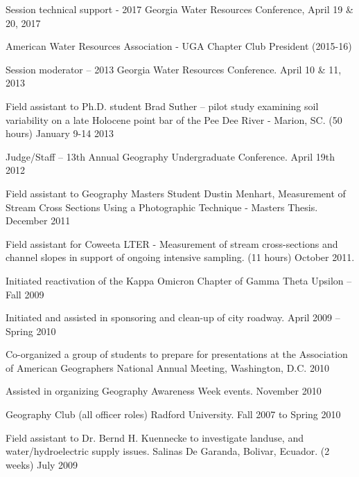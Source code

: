 \documentclass[10pt,letterpaper]{article}
\newenvironment{indentsection}[1]%
{\begin{list}{}%
	{\setlength{\leftmargin}{#1}}%
	\item[]%
}
{\end{list}}
\begin{document}
	\begin{itemize*}

	\item
	Session technical support - 2017 Georgia Water Resources Conference, April 19 \& 20, 2017
	\item
	American Water Resources Association - UGA Chapter Club President (2015-16)
	\item
	Session moderator – 2013 Georgia Water Resources Conference. April 10 \& 11, 2013
	\item
	Field assistant to Ph.D. student Brad Suther – pilot study examining soil variability on a late Holocene point bar of the Pee Dee River - Marion, SC. (50 hours) January 9-14 2013
	\item
	Judge/Staff – 13th Annual Geography Undergraduate Conference. April 19th 2012
	\item
	Field assistant to Geography Masters Student Dustin Menhart, Measurement of Stream Cross Sections Using a Photographic Technique - Masters Thesis. December 2011
	\item 
	Field assistant for Coweeta LTER - Measurement of stream cross-sections and channel slopes in support of ongoing intensive sampling. (11 hours) October 2011.
	\item 
	Initiated reactivation of the Kappa Omicron Chapter of Gamma Theta Upsilon – Fall 2009
	\item 
	Initiated and assisted in sponsoring and clean-up of city roadway. April 2009 – Spring 2010
	\item 
	Co-organized a group of students to prepare for presentations at the Association of American Geographers National Annual Meeting, Washington, D.C. 2010
	\item 
	Assisted in organizing Geography Awareness Week events. November 2010
	\item 
	Geography Club (all officer roles) Radford University. Fall 2007 to Spring 2010
	\item 
	Field assistant to Dr. Bernd H. Kuennecke to investigate landuse, and water/hydroelectric supply issues. Salinas De Garanda, Bolivar, Ecuador. (2 weeks) July 2009


\end{itemize*}


	
\end{document}
